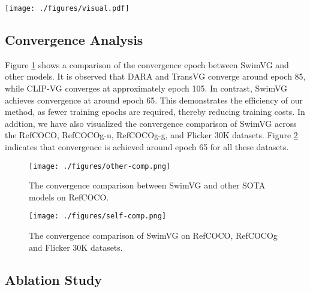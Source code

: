 \begin{figure*}[t]
\centering
\texttt{[image: ./figures/visual.pdf]}
\caption{Visualizations of attention maps, prediction results (yellow bounding boxes) and ground truth (red bounding boxes).}
\label{fig:visualizations}
\end{figure*}


\subsection{Convergence Analysis}
Figure \ref{other-convergence} shows a comparison of the convergence epoch between SwimVG and other models. It is observed that DARA and TransVG converge around epoch 85, while CLIP-VG converges at approximately epoch 105. In contrast, SwimVG achieves convergence at around epoch 65. This demonstrates the efficiency of our method, as fewer training epochs are required, thereby reducing training costs. In addtion, we have also visualized the convergence comparison of SwimVG across the RefCOCO, RefCOCOg-u, RefCOCOg-g, and Flicker 30K datasets. Figure \ref{self-conver} indicates that convergence is achieved around epoch 65 for all these datasets.




\begin{figure}
\centering
\texttt{[image: ./figures/other-comp.png]}
\vspace{-4mm}
\caption{The convergence comparison between SwimVG and other SOTA models on RefCOCO.}
\vspace{-3mm}
\label{other-convergence}
\end{figure}


\begin{figure}
\centering
\texttt{[image: ./figures/self-comp.png]}
\vspace{-4mm}
\caption{The convergence comparison of SwimVG on RefCOCO, RefCOCOg and Flicker 30K datasets.}
\vspace{-3mm}
\label{self-conver}
\end{figure}

\subsection{Ablation Study}




